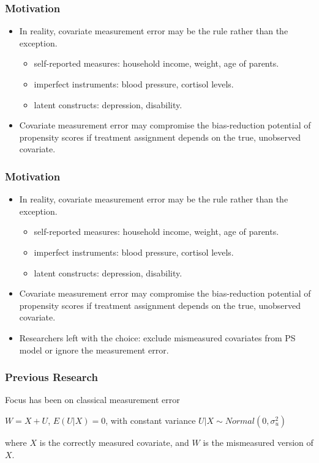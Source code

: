 \documentclass{beamer}
\begin{document}
\begin{frame}

\frametitle{ Motivation}

\begin{itemize}
\item In reality, covariate measurement error may be the rule rather than the exception. 
\begin{itemize}
	\item self-reported measures: household income, weight, age of parents.
	\item imperfect instruments: blood pressure, cortisol levels.
	\item latent constructs: depression, disability.
\end{itemize}
\item Covariate measurement error may compromise the bias-reduction potential of propensity scores if treatment assignment depends on the true, unobserved covariate.
\end{itemize}

\end{frame} 

\begin{frame}

\frametitle{ Motivation}


\begin{itemize}
\item In reality, covariate measurement error may be the rule rather than the exception. 
\begin{itemize}
	\item self-reported measures: household income, weight, age of parents.
	\item imperfect instruments: blood pressure, cortisol levels.
	\item latent constructs: depression, disability.
\end{itemize}
\item Covariate measurement error may compromise the bias-reduction potential of propensity scores if treatment assignment depends on the true, unobserved covariate.
\item Researchers left with the choice: exclude mismeasured covariates from PS model or ignore the measurement error. 

\end{itemize}

\end{frame}

\begin{frame}
\frametitle{ Previous Research}


Focus has been on classical measurement error


$W = X + U$,  $E(U \vert X)=0$,   with constant variance $U \vert X \sim Normal(0,\sigma^2_u)$  
 

where $X$ is the correctly measured covariate, and  $W$ is the mismeasured version of $X$.

\end{frame} 
\end{document}
